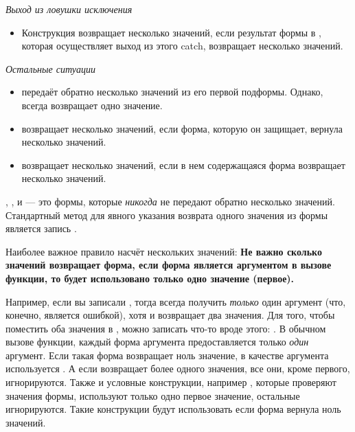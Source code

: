 \begin{flushdesc}
\item[\emph{Выход из ловушки исключения}]\leavevmode
\begin{itemize}

\item
Конструкция  возвращает несколько значений, если результат формы в
, которая осуществляет выход из этого catch, возвращает несколько
значений.
\end{itemize}

\item[\emph{Остальные ситуации}]\leavevmode
\begin{itemize}

\item
{} передаёт обратно несколько значений из его первой
подформы. Однако,  всегда возвращает одно значение.

\item
{} возвращает несколько значений, если форма, которую он
защищает, вернула несколько значений.

\item
{} возвращает несколько значений, если в нем содержащаяся форма
возвращает несколько значений.
\end{itemize}
\end{flushdesc}

,
,  и  --- это формы, которые
\emph{никогда} не передают обратно несколько значений.
Стандартный метод для явного указания возврата одного значения из формы  
является запись .

Наиболее важное правило насчёт нескольких значений:
\textbf{Не важно сколько значений возвращает форма, если форма является
  аргументом в вызове функции, то будет использовано только одно значение
  (первое).} 

Например, если вы записали , тогда  всегда
получить \emph{только} один аргумент (что, конечно, является ошибкой), хотя и
 возвращает два значения. Для того, чтобы поместить оба значения
 в , можно записать что-то вроде этого:
.
В обычном вызове функции, каждый форма аргумента предоставляется только
\emph{один} аргумент. Если такая форма возвращает ноль значение, в качестве
аргумента используется {\false}. А если возвращает более одного значения, все
они, кроме первого, игнорируются.
Также и условные конструкции, например , которые проверяют значения
формы, используют только одно первое значение, остальные игнорируются.
Такие конструкции будут использовать {\false} если форма вернула ноль значений.
